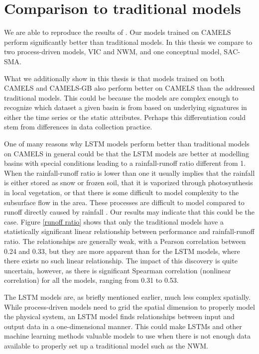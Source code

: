 \section{Comparison to traditional models}
We are able to reproduce the results of \citet{lstm_second_paper,lstm_third_paper}. 
Our models 
trained on CAMELS perform significantly better than traditional models. In this 
thesis we compare to two process-driven models, VIC and NWM, and one conceptual 
model, SAC-SMA. 

What we additionally show in this thesis is that models trained on both CAMELS and CAMELS-GB 
also perform better on CAMELS than the addressed traditional models. This could 
be because the models are complex enough to recognize which dataset a given 
basin is from based on underlying signatures in either the time series or the 
static attributes. Perhaps this differentiation could stem from differences in 
data collection practice. 

One of many reasons why LSTM models perform better than traditional models on CAMELS in general 
could be that the LSTM 
models are better at modelling basins with special conditions leading to 
a rainfall-runoff ratio different from 1. When the rainfall-runoff ratio is lower 
than one it usually implies that the rainfall is either stored as snow or frozen 
soil, that it is vaporized through photosynthesis in local vegetation, or that there 
is some difficult to model complexity to the subsurface flow in the area. 
These processes are difficult to model compared to runoff directly caused by 
rainfall \citep{process-driven-history}.
Our results may indicate that this could be the case.
Figure \ref{runoff ratio} shows that only the traditional models have 
a statistically significant linear relationship between performance and 
rainfall-runoff ratio. The relationships are generally weak, with a Pearson 
correlation between 0.24 and 0.33, but they are more apparent than 
for the LSTM models, where there exists no such linear relationship. The impact 
of this discovery is quite uncertain, however, as there is significant 
Spearman correlation (nonlinear correlation) for all the models, ranging 
from 0.31 to 0.53.

The LSTM models are, as briefly mentioned earlier, much less complex spatially. 
While process-driven models need to grid the 
spatial dimension to properly model the physical system, an LSTM model finds 
relationships between input and output data in a one-dimensional manner. This could 
make LSTMs and other machine learning methods valuable models to use when there is not 
enough data available to properly set up a traditional model such as the NWM.
